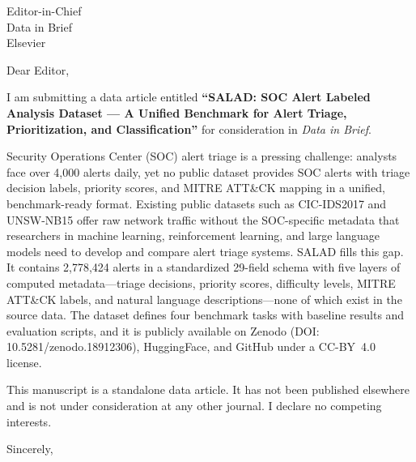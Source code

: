 \documentclass[12pt]{letter}
\date{\today}
\begin{document}
\begin{letter}{Editor-in-Chief\\Data in Brief\\Elsevier}

\opening{Dear Editor,}

I am submitting a data article entitled \textbf{``SALAD: SOC Alert Labeled Analysis Dataset --- A Unified Benchmark for Alert Triage, Prioritization, and Classification''} for consideration in \textit{Data in Brief}.

Security Operations Center (SOC) alert triage is a pressing challenge: analysts face over 4,000 alerts daily, yet no public dataset provides SOC alerts with triage decision labels, priority scores, and MITRE ATT\&CK mapping in a unified, benchmark-ready format. Existing public datasets such as CIC-IDS2017 and UNSW-NB15 offer raw network traffic without the SOC-specific metadata that researchers in machine learning, reinforcement learning, and large language models need to develop and compare alert triage systems. SALAD fills this gap. It contains 2,778,424 alerts in a standardized 29-field schema with five layers of computed metadata---triage decisions, priority scores, difficulty levels, MITRE ATT\&CK labels, and natural language descriptions---none of which exist in the source data. The dataset defines four benchmark tasks with baseline results and evaluation scripts, and it is publicly available on Zenodo (DOI: 10.5281/zenodo.18912306), HuggingFace, and GitHub under a CC-BY~4.0 license.

This manuscript is a standalone data article. It has not been published elsewhere and is not under consideration at any other journal. I declare no competing interests.

\closing{Sincerely,}

\end{letter}
\end{document}
